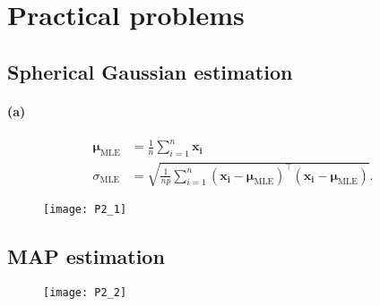 \documentclass[a4paper,11pt]{article}
\begin{document}
\section{Practical problems}
\subsection{Spherical Gaussian estimation}
\paragraph{(a)}
\begin{align*}
\boldsymbol\mu_\mathrm{\scriptscriptstyle{MLE}}&=\frac{1}{n}\sum_{i=1}^n\mathbf{x_i}\\
\sigma_\mathrm{\scriptscriptstyle{MLE}}&=\sqrt{\frac{1}{np}\sum_{i=1}^n(\mathbf{x_i}-\boldsymbol\mu_\mathrm{\scriptscriptstyle{MLE}})^\top(\mathbf{x_i}-\boldsymbol\mu_\mathrm{\scriptscriptstyle{MLE}})}.
\end{align*}
\begin{figure}[h!]
  \begin{center}
    \texttt{[image: P2\_1]}
  \end{center}
\end{figure}
\subsection{MAP estimation}
\begin{figure}[h!]
	\begin{center}
		\texttt{[image: P2\_2]}
	\end{center}
\end{figure}
\end{document}

